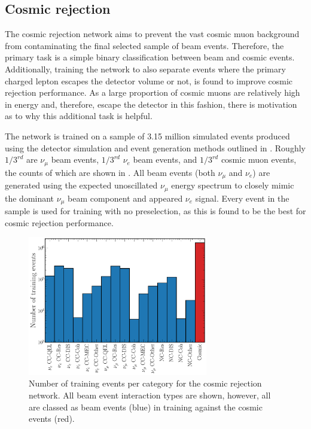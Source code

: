 \subsection{Cosmic rejection} %
\label{sec:cnn_specific_cosmic} %

The cosmic rejection network aims to prevent the vast cosmic muon background from contaminating
the final selected sample of beam events. Therefore, the primary task is a simple binary
classification between beam and cosmic events. Additionally, training the network to also separate
events where the primary charged lepton escapes the detector volume or not, is found to improve
cosmic rejection performance. As a large proportion of cosmic muons are relatively high in energy
and, therefore, escape the detector in this fashion, there is motivation as to why this additional
task is helpful.

The network is trained on a sample of 3.15 million simulated events produced using the detector
simulation and event generation methods outlined in . Roughly
$1/3^{rd}$ are $\nu_{\mu}$ beam events, $1/3^{rd}$ $\nu_{e}$ beam events, and $1/3^{rd}$ cosmic
muon events, the counts of which are shown in . All beam
events (both $\nu_{\mu}$ and $\nu_{e}$) are generated using the expected unoscillated \chipsfive
$\nu_{\mu}$ energy spectrum to closely mimic the dominant $\nu_{\mu}$ beam component and appeared
$\nu_{e}$ signal. Every event in the sample is used for training with no preselection, as this is
found to be the best for cosmic rejection performance.

\begin{figure} %
    \includegraphics[width=0.7\textwidth]{diagrams/7-results/explore_cosmic_training_sample.pdf}
    \caption[Number of training events per category for the cosmic rejection network]
    {Number of training events per category for the cosmic rejection network. All beam event
        interaction types are shown, however, all are classed as beam events (blue) in training
        against the cosmic events (red).}
    \label{fig:cosmic_training_sample}
\end{figure}

